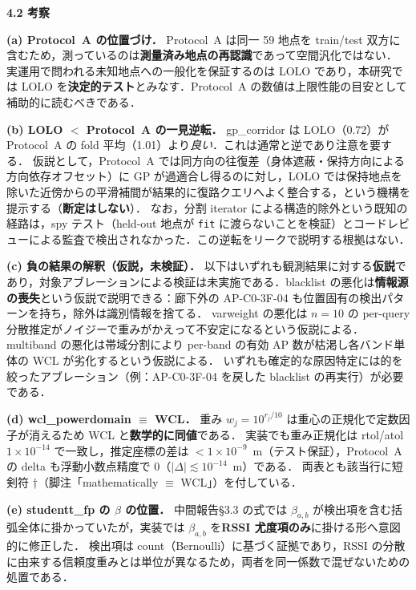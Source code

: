 \documentclass[a4paper,twocolumn]{ltjsarticle}
\begin{document}
\smallskip\noindent\textbf{4.2\; 考察}\;

\noindent\textbf{(a) Protocol~A の位置づけ．}\;
Protocol~A は同一 59 地点を train/test 双方に含むため，測っているのは\textbf{測量済み地点の再認識}であって空間汎化ではない．
実運用で問われる未知地点への一般化を保証するのは LOLO であり，本研究では LOLO を\textbf{決定的テスト}とみなす．Protocol~A の数値は上限性能の目安として補助的に読むべきである．

\noindent\textbf{(b) LOLO $<$ Protocol~A の一見逆転．}\;
gp\_corridor は LOLO（0.72）が Protocol~A の fold 平均（1.01）より\emph{良い}．これは通常と逆であり注意を要する．
仮説として，Protocol~A では同方向の往復差（身体遮蔽・保持方向による方向依存オフセット）に GP が過適合し得るのに対し，LOLO では保持地点を除いた近傍からの平滑補間が結果的に復路クエリへよく整合する，という機構を提示する（\textbf{断定はしない}）．
なお，分割 iterator による構造的除外という既知の経路は，spy テスト（held-out 地点が \texttt{fit} に渡らないことを検証）とコードレビューによる監査で検出されなかった．この逆転をリークで説明する根拠はない．

\noindent\textbf{(c) 負の結果の解釈（仮説，未検証）．}\;
以下はいずれも観測結果に対する\textbf{仮説}であり，対象アブレーションによる検証は未実施である．blacklist の悪化は\textbf{情報源の喪失}という仮説で説明できる：廊下外の AP-C0-3F-04 も位置固有の検出パターンを持ち，除外は識別情報を捨てる．
varweight の悪化は $n{=}10$ の per-query 分散推定がノイジーで重みがかえって不安定になるという仮説による．
multiband の悪化は帯域分割により per-band の有効 AP 数が枯渇し各バンド単体の WCL が劣化するという仮説による．
いずれも確定的な原因特定には的を絞ったアブレーション（例：AP-C0-3F-04 を戻した blacklist の再実行）が必要である．

\noindent\textbf{(d) wcl\_powerdomain $\equiv$ WCL．}\;
重み $w_j=10^{r_j/10}$ は重心の正規化で定数因子が消えるため WCL と\textbf{数学的に同値}である．
実装でも重み正規化は rtol/atol~$1\times10^{-14}$ で一致し，推定座標の差は $<1\times10^{-9}$~m（テスト保証），Protocol~A の delta も浮動小数点精度で 0（$|\Delta|\lesssim10^{-14}$~m）である．
両表とも該当行に短剣符 †（脚注「mathematically $\equiv$ WCL」）を付している．

\noindent\textbf{(e) studentt\_fp の $\beta$ の位置．}\;
中間報告§3.3 の式では $\beta_{a,b}$ が検出項を含む括弧全体に掛かっていたが，実装では $\beta_{a,b}$ を\textbf{RSSI 尤度項のみ}に掛ける形へ意図的に修正した．
検出項は count（Bernoulli）に基づく証拠であり，RSSI の分散に由来する信頼度重みとは単位が異なるため，両者を同一係数で混ぜないための処置である．
\end{document}
